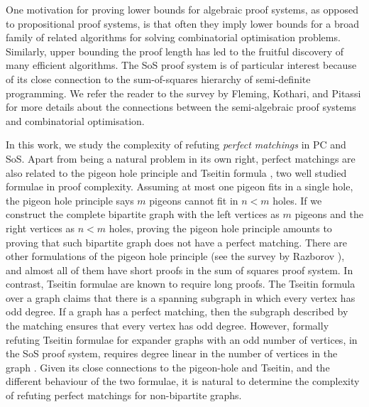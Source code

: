 \documentclass[11pt]{article}
\begin{document}
One motivation for proving lower bounds for algebraic proof systems, as opposed to propositional proof systems, is that often they imply lower bounds for a broad family of related algorithms for solving combinatorial optimisation problems.
Similarly, upper bounding the proof length has led to the fruitful discovery of many efficient algorithms.
The SoS proof system is of particular interest because of its close connection to the sum-of-squares hierarchy of semi-definite programming.
We refer the reader to the survey by Fleming, Kothari, and Pitassi \cite{fleming2019semialgebraic} for more details about the connections between the semi-algebraic proof systems and combinatorial optimisation.\par
In this work, we study the complexity of refuting \emph{perfect matchings} in PC and SoS.
Apart from being a natural problem in its own right, perfect matchings are also related to the pigeon hole principle \citep{maciel2000new, pitassi1993exponential, raz2004resolution, razbarov2002pgp, razborov2003resolution} and Tseitin formula \citep{filmus2013towards, galesi2019bounded, glinskih2017satisfiable, grigoriev2001linear}, two well studied formulae in proof complexity.
Assuming at most one pigeon fits in a single hole, the pigeon hole principle says $m$ pigeons cannot fit in $n < m$ holes.
If we construct the complete bipartite graph with the left vertices as $m$ pigeons and the right vertices as $n < m$ holes, proving the pigeon hole principle amounts to proving that such bipartite graph does not have a perfect matching.
There are other formulations of the pigeon hole principle (see the survey by Razborov \citep{razbarov2002pgp}), and almost all of them have short proofs in the sum of squares proof system.
In contrast, Tseitin formulae are known to require long proofs. The Tseitin formula over a graph claims that there is a spanning subgraph in which every vertex has odd degree.
If a graph has a perfect matching, then the subgraph described by the matching ensures that every vertex has odd degree.
However, formally refuting Tseitin formulae for expander graphs with an odd number of vertices, in the SoS proof system, requires degree linear in the number of vertices in the graph \cite{grigoriev2001linear}.
Given its close connections to the pigeon-hole and Tseitin, and the different behaviour of the two formulae, it is natural to determine the complexity of refuting perfect matchings for non-bipartite graphs.
\end{document}
